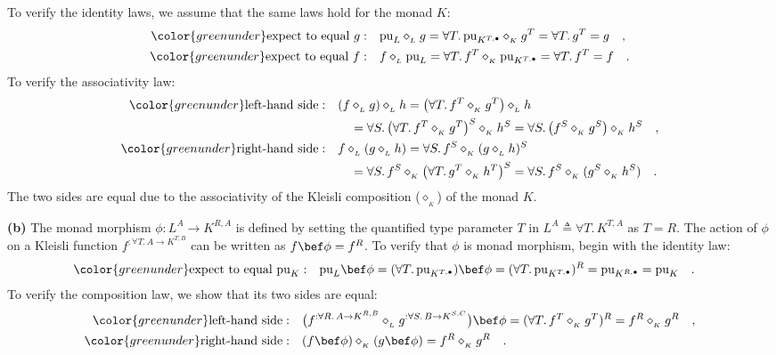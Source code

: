 To verify the identity laws, we assume that the same laws hold for
the monad $K$:
\begin{align*}
{\color{greenunder}\text{expect to equal }g:}\quad & \text{pu}_{L}\diamond_{_{L}}g=\forall T.\,\text{pu}_{K^{T,\bullet}}\diamond_{_{K}}g^{T}=\forall T.\,g^{T}=g\quad,\\
{\color{greenunder}\text{expect to equal }f:}\quad & f\diamond_{_{L}}\text{pu}_{L}=\forall T.\,f^{T}\diamond_{_{K}}\text{pu}_{K^{T,\bullet}}=\forall T.\,f^{T}=f\quad.
\end{align*}
To verify the associativity law:
\begin{align*}
{\color{greenunder}\text{left-hand side}:}\quad & (f\diamond_{_{L}}g)\diamond_{_{L}}h=\big(\forall T.\,f^{T}\diamond_{_{K}}g^{T}\big)\diamond_{_{L}}h\\
 & \quad=\forall S.\,\big(\forall T.\,f^{T}\diamond_{_{K}}g^{T}\big)^{S}\diamond_{_{K}}h^{S}=\forall S.\,\big(f^{S}\diamond_{_{K}}g^{S}\big)\diamond_{_{K}}h^{S}\quad,\\
{\color{greenunder}\text{right-hand side}:}\quad & f\diamond_{_{L}}(g\diamond_{_{L}}h)=\forall S.\,f^{S}\diamond_{_{K}}(g\diamond_{_{L}}h)^{S}\\
 & \quad=\forall S.\,f^{S}\diamond_{_{K}}\big(\forall T.\,g^{T}\diamond_{_{K}}h^{T}\big)^{S}=\forall S.\,f^{S}\diamond_{_{K}}(g^{S}\diamond_{_{K}}h^{S})\quad.
\end{align*}
The two sides are equal due to the associativity of the Kleisli composition
($\diamond_{_{K}}$) of the monad $K$.

\textbf{(b)} The monad morphism $\phi:L^{A}\rightarrow K^{R,A}$ is
defined by setting the quantified type parameter $T$ in $L^{A}\triangleq\forall T.\,K^{T,A}$
as $T=R$. The action of $\phi$ on a Kleisli function $f^{:\forall T.\,A\rightarrow K^{T,B}}$
can be written as $f\bef\phi=f^{R}$. To verify that $\phi$ is monad
morphism, begin with the identity law:
\begin{align*}
{\color{greenunder}\text{expect to equal }\text{pu}_{K}:}\quad & \text{pu}_{L}\bef\phi=(\forall T.\,\text{pu}_{K^{T,\bullet}})\bef\phi=(\forall T.\,\text{pu}_{K^{T,\bullet}})^{R}=\text{pu}_{K^{R,\bullet}}=\text{pu}_{K}\quad.
\end{align*}
To verify the composition law, we show that its two sides are equal:
\begin{align*}
{\color{greenunder}\text{left-hand side}:}\quad & \big(f^{:\forall R.\,A\rightarrow K^{R,B}}\diamond_{_{L}}g^{:\forall S.\,B\rightarrow K^{S,C}}\big)\bef\phi=(\forall T.\,f^{T}\diamond_{_{K}}g^{T})^{R}=f^{R}\diamond_{_{K}}g^{R}\quad,\\
{\color{greenunder}\text{right-hand side}:}\quad & (f\bef\phi)\diamond_{_{K}}(g\bef\phi)=f^{R}\diamond_{_{K}}g^{R}\quad.
\end{align*}


